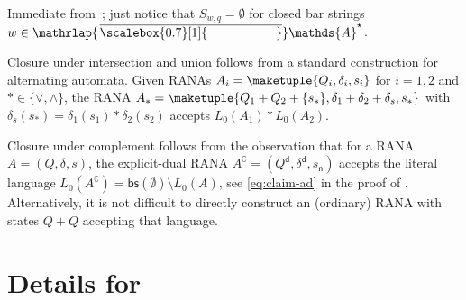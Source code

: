 \documentclass[10pt,a4paper]{amsart}
\theoremstyle{definition}
\newcommand{\At}{\mathds{A}}
\newcommand{\barAs}{\barNames^{\star}}
\newcommand{\bars}{\mathsf{bs}}
\newcommand{\negsym}{\mathsf{n}}
\newcommand{\negstate}[1]{#1_{\negsym}}
\newcommand{\dual}[1]{{#1}^\mathsf{d}}
\newcommand{\names}{\At}
\newcommand{\set}[1]{\{#1\}}
\newcommand{\mybar}[3]{%
  \mathrlap{\hspace{#2}\overline{\scalebox{#1}[1]{\phantom{\ensuremath{#3}}}}}\ensuremath{#3}
}
\newcommand{\barNames}{{\mybar{0.7}{1.25pt}{\names}}}
\begin{document}
\begin{IEEEproof}
Immediate from~; just notice that $S_{w,q}=\emptyset$ for closed bar strings $w\in \barAs$. 
\end{IEEEproof}

\begin{IEEEproof}
  Closure under intersection and union follows from a standard construction for alternating automata. Given RANAs $A_i = \maketuple{Q_i, \delta_i, s_i}$
  for $i = 1, 2$ and $\ast\in\set{\vee,\wedge}$, the RANA $A_{\ast} = \maketuple{Q_1 + Q_2 + \set{s_\ast},
  \delta_1 + \delta_2 + \delta_s, s_\ast}$ 
  with $\delta_s(s_\ast) = \delta_1(s_1) \ast \delta_2(s_2)$ accepts $L_0(A_1) \ast L_0(A_2)$.

Closure under complement follows from the observation that for a RANA $A=(Q,\delta,s)$, the explicit-dual RANA $A^\complement=(\dual{Q},\dual{\delta},\negstate{s})$ accepts the literal language $L_0(A^\complement)=\bars(\emptyset)\setminus L_0(A)$, see \eqref{eq:claim-ad} in the proof of . Alternatively, it is not difficult to directly construct an (ordinary) RANA with states $Q+Q$ accepting that language.
\end{IEEEproof}

\section{Details for~\label{app:secLOG}}
\end{document}
